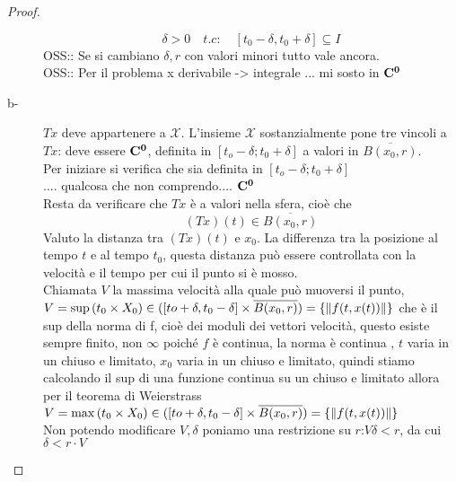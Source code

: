 \begin{proof}
\begin{description}
		$$\delta>0\quad t.c:\quad \left[t_0-\delta,t_0+\delta\right]\subseteq I$$
		OSS:: Se si cambiano $\delta, r$ con valori minori tutto vale ancora.\\
		OSS:: Per il problema x derivabile -> integrale  ... mi sosto in $\mathbf{C^{0}}$
		\item[b-] $Tx$ deve appartenere a $\mathcal{X}$. L'insieme $\mathcal{X}$ sostanzialmente pone tre vincoli a $Tx$: deve essere $\mathbf{C^{0}}$, definita in $\left[t_o-\delta;t_0+\delta\right]$ a valori in $\overline{B(x_0,r)}$.\\
		Per iniziare si verifica che sia definita in $\left[t_o-\delta;t_0+\delta\right]$\\
		.... qualcosa che non comprendo.... $\mathbf{C^{0}}$\\
		Resta da verificare che $Tx$ è a valori nella sfera, cioè che 
		$$(Tx)(t) \in \overline{B(x_0,r)}$$
		Valuto la distanza tra $(Tx)(t)$ e $x_0$. La differenza tra la posizione al tempo $t$ e al tempo $t_0$, questa distanza può essere controllata con la velocità e il tempo per cui il punto si è mosso.\\
		Chiamata $V$ la massima velocità alla quale può muoversi il punto, $V=\sup\limits{(t_0\times X_0)\in (\left[to+\delta,t_0-\delta\right]\times\overline{B(x_0,r)})}=\left\{\left\|f(t,x(t))\right\|\right\}$ che è il sup della norma di f, cioè dei moduli dei vettori velocità, questo esiste sempre finito, non $\infty$ poiché $f$ è continua, la norma è continua , $t$ varia in un chiuso e limitato, $x_0$ varia in un chiuso e limitato, quindi stiamo calcolando  il sup di una funzione continua su un chiuso e limitato allora per il teorema di Weierstrass $V=\max\limits{(t_0\times X_0)\in (\left[to+\delta,t_0-\delta\right]\times\overline{B(x_0,r)})}=\left\{\left\|f(t,x(t))\right\|\right\}$\\
		Non potendo modificare $V, \delta$ poniamo una restrizione su $r$:$V\delta < r$, da cui $\delta < r\cdot V$
		

\end{description}
\end{proof}
